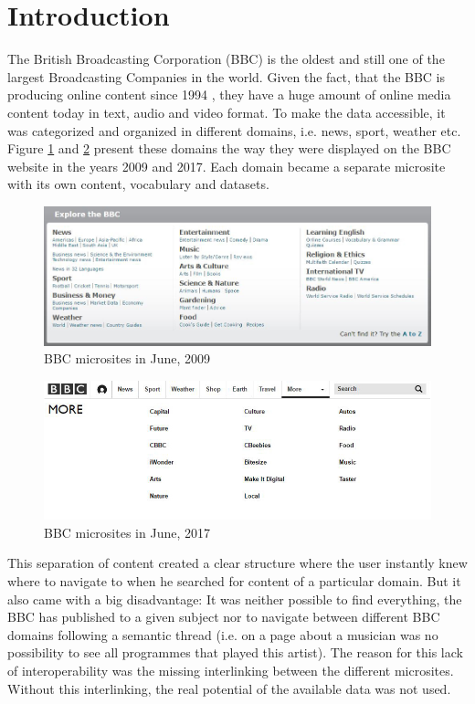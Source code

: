 \documentclass{llncs}
\begin{document}
\section{Introduction}
%
The British Broadcasting Corporation (BBC) is the oldest and still one of the largest Broadcasting Companies in the world. Given the fact, that the BBC is producing online content since 1994 \cite{st1994}, they have a huge amount of online media content today in text, audio and video format. To make the data accessible, it was categorized and organized in different domains, i.e. news, sport, weather etc. Figure \ref{fig:domains2009} and \ref{fig:domains2017} present these domains the way they were displayed on the BBC website in the years 2009 and 2017. Each domain became a separate microsite with its own content, vocabulary and datasets.
\begin{figure}[!ht]
  \includegraphics[width=\textwidth]{images/bbc_domains_2009}
  \caption{BBC microsites in June, 2009}
  \label{fig:domains2009}
\end{figure}
\begin{figure}[!ht]
  \includegraphics[width=\textwidth]{images/bbc_domains_2017}
  \caption{BBC microsites in June, 2017}
  \label{fig:domains2017}
\end{figure}

This separation of content created a clear structure where the user instantly knew where to navigate to when he searched for content of a particular domain. But it also came with a big disadvantage: It was neither possible to find everything, the BBC has published to a given subject nor to navigate between different BBC domains following a semantic thread (i.e. on a page about a musician was no possibility to see all programmes that played this artist). The reason for this lack of interoperability was the missing interlinking between the different microsites. Without this interlinking, the real potential of the available data was not used.
\end{document}
